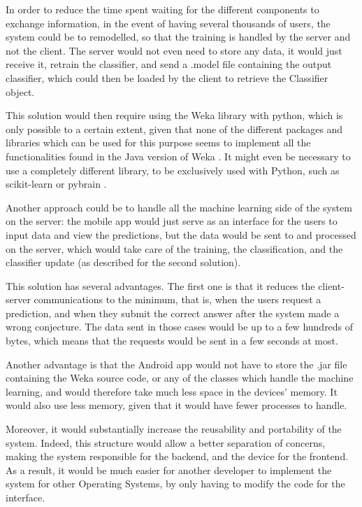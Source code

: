 \documentclass{mproj}
\begin{document}
In order to reduce the time spent waiting for the different components to exchange information, in the event of having several thousands of users, the system could be to remodelled, so that the training is handled by the server and not the client. The server would not even need to store any data, it would just receive it, retrain the classifier, and send a .model file containing the output classifier, which could then be loaded by the client to retrieve the Classifier object. \par

This solution would then require using the Weka library with python, which is only possible to a certain extent, given that none of the different packages and libraries which can be used for this purpose seems to implement all the functionalities found in the Java version of Weka \cite{wekapython}. It might even be necessary to use a completely different library, to be exclusively used with Python, such as scikit-learn \cite{scikit-learn} or pybrain \cite{pybrain}. \par

Another approach could be to handle all the machine learning side of the system on the server: the mobile app would just serve as an interface for the users to input data and view the predictions, but the data would be sent to and processed on the server, which would take care of the training, the classification, and the classifier update (as described for the second solution). \par

This solution has several advantages. The first one is that it reduces the client-server communications to the minimum, that is, when the users request a prediction, and when they submit the correct answer after the system made a wrong conjecture. The data sent in those cases would be up to a few hundreds of bytes, which means that the requests would be sent in a few seconds at most. \par

Another advantage is that the Android app would not have to store the .jar file containing the Weka source code, or any of the classes which handle the machine learning, and would therefore take much less space in the devices' memory. It would also use less memory, given that it would have fewer processes to handle. \par

Moreover, it would substantially increase the reusability and portability of the system. Indeed, this structure would allow a better separation of concerns, making the system responsible for the backend, and the device for the frontend. As a result, it would be much easier for another developer to implement the system for other Operating Systems, by only having to modify the code for the interface. \par
\end{document}
